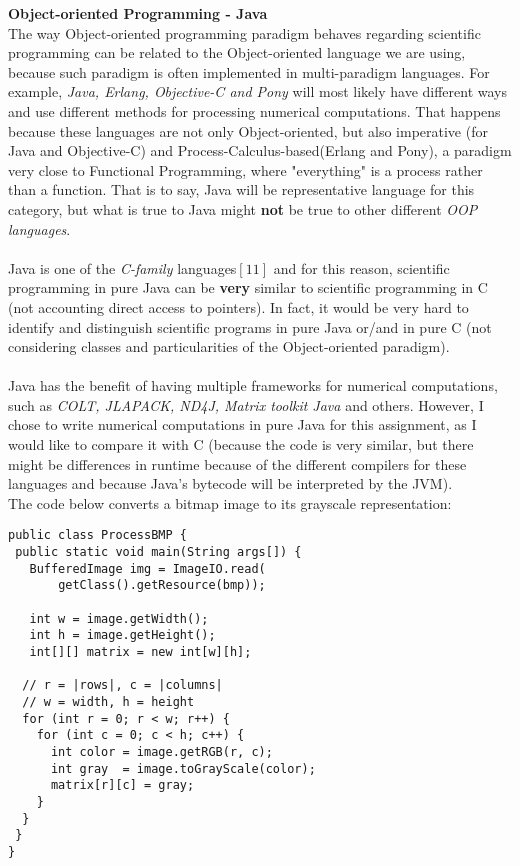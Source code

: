 \documentclass[conference]{IEEEtran}
\begin{document}
\textbf{ Object-oriented Programming - Java }\\
The way Object-oriented programming paradigm behaves regarding scientific programming can be related to the Object-oriented language we are using, because such paradigm is often implemented in multi-paradigm languages. For example, \textit{Java, Erlang, Objective-C and Pony} will most likely have different ways and use different methods for processing numerical computations. That happens because these languages are not only Object-oriented, but also imperative (for Java and Objective-C) and Process-Calculus-based(Erlang and Pony), a paradigm very close to Functional Programming, where "everything" is a process rather than a function. That is to say, Java will be representative language for this category, but what is true to Java might \textbf{not} be true to other different \textit{OOP languages}.
\\\\
Java is one of the \textit{C-family} languages$[11]$ and for this reason, scientific programming in pure Java can be \textbf{very} similar to scientific programming in C (not accounting direct access to pointers). In fact, it would be very hard to identify and distinguish scientific programs in pure Java or/and in pure C (not considering classes and particularities of the Object-oriented paradigm).
\\\\
Java has the benefit of having multiple frameworks for numerical computations, such as \textit{COLT, JLAPACK, ND4J, Matrix toolkit Java} and others. However, I chose to write numerical computations in pure Java for this assignment, as I would like to compare it with C (because the code is very similar, but there might be differences in runtime because of the different compilers for these languages and because Java's bytecode will be interpreted by the JVM). 
\\
The code below converts a bitmap image to its grayscale representation:

\lstset{language=java}
\begin{lstlisting}[frame=single]
public class ProcessBMP {
 public static void main(String args[]) {
   BufferedImage img = ImageIO.read(
       getClass().getResource(bmp));
   
   int w = image.getWidth();
   int h = image.getHeight();
   int[][] matrix = new int[w][h];

  // r = |rows|, c = |columns|
  // w = width, h = height
  for (int r = 0; r < w; r++) {
    for (int c = 0; c < h; c++) {
      int color = image.getRGB(r, c);
      int gray  = image.toGrayScale(color);
      matrix[r][c] = gray; 
    }
  }
 }   
}
\end{lstlisting}
\end{document}
